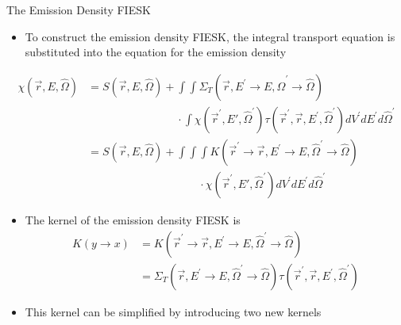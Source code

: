 \documentclass{beamer}
\begin{document}
\begin{frame}{The Emission Density FIESK}

  \begin{itemize}
    \item To construct the emission density FIESK, the integral transport 
      equation is substituted into the equation for the emission density
  \end{itemize}
  \begin{align}
    \chi(\vec{r},E,\hat{\Omega}) & = S(\vec{r},E,\hat{\Omega}) +
    \int\int \Sigma_T(\vec{r},E^{'} \to E, \hat{\Omega}^{'} \to \hat{\Omega})
    \nonumber \\
    & \qquad \qquad \qquad \qquad \cdot
    \int \chi(\vec{r}^{'},E',\hat{\Omega}^{'})
    \tau(\vec{r}^{'},\vec{r},E^{'},\hat{\Omega}^{'})
    dV^{'}dE^{'}d\hat{\Omega}^{'} \nonumber \\
    & = S(\vec{r},E,\hat{\Omega}) + \int\int\int
    K(\vec{r}^{'} \to \vec{r}, E^{'} \to E, \hat{\Omega}^{'} \to \hat{\Omega})
    \nonumber \\
    & \qquad \qquad \qquad \qquad \qquad \cdot
    \chi(\vec{r}^{'},E',\hat{\Omega}^{'}) dV^{'}dE^{'}d\hat{\Omega}^{'}
    \nonumber
  \end{align}

  \begin{itemize}
    \item The kernel of the emission density FIESK is
      \begin{align}
        K(y \to x) & = K(\vec{r}^{'} \to \vec{r}, E^{'} \to E, 
        \hat{\Omega}^{'} \to \hat{\Omega}) \nonumber \\
        & = \Sigma_T(\vec{r},E^{'} \to E, \hat{\Omega}^{'} \to \hat{\Omega})
        \tau(\vec{r}^{'},\vec{r},E^{'},\hat{\Omega}^{'}) \nonumber
      \end{align}
    \item This kernel can be simplified by introducing two new kernels
  \end{itemize}

\end{frame}
\end{document}
